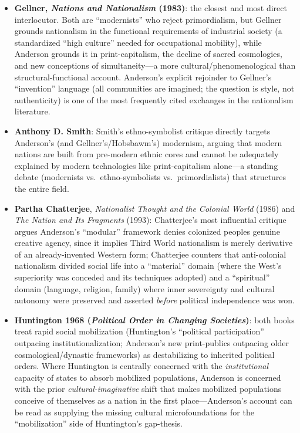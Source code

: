 \documentclass[12pt]{article}
\begin{document}
\begin{itemize}[leftmargin=*, itemsep=4pt]
    \item \textbf{Gellner, \textit{Nations and Nationalism} (1983)}: the closest and most direct interlocutor. Both are ``modernists'' who reject primordialism, but Gellner grounds nationalism in the functional requirements of industrial society (a standardized ``high culture'' needed for occupational mobility), while Anderson grounds it in print-capitalism, the decline of sacred cosmologies, and new conceptions of simultaneity---a more cultural/phenomenological than structural-functional account. Anderson's explicit rejoinder to Gellner's ``invention'' language (all communities are imagined; the question is style, not authenticity) is one of the most frequently cited exchanges in the nationalism literature.
    \item \textbf{Anthony D. Smith}: Smith's ethno-symbolist critique directly targets Anderson's (and Gellner's/Hobsbawm's) modernism, arguing that modern nations are built from pre-modern ethnic cores and cannot be adequately explained by modern technologies like print-capitalism alone---a standing debate (modernists vs.\ ethno-symbolists vs.\ primordialists) that structures the entire field.
    \item \textbf{Partha Chatterjee}, \textit{Nationalist Thought and the Colonial World} (1986) and \textit{The Nation and Its Fragments} (1993): Chatterjee's most influential critique argues Anderson's ``modular'' framework denies colonized peoples genuine creative agency, since it implies Third World nationalism is merely derivative of an already-invented Western form; Chatterjee counters that anti-colonial nationalism divided social life into a ``material'' domain (where the West's superiority was conceded and its techniques adopted) and a ``spiritual'' domain (language, religion, family) where inner sovereignty and cultural autonomy were preserved and asserted \emph{before} political independence was won.
    \item \textbf{Huntington 1968 (\textit{Political Order in Changing Societies})}: both books treat rapid social mobilization (Huntington's ``political participation'' outpacing institutionalization; Anderson's new print-publics outpacing older cosmological/dynastic frameworks) as destabilizing to inherited political orders. Where Huntington is centrally concerned with the \emph{institutional} capacity of states to absorb mobilized populations, Anderson is concerned with the prior \emph{cultural-imaginative} shift that makes mobilized populations conceive of themselves as a nation in the first place---Anderson's account can be read as supplying the missing cultural microfoundations for the ``mobilization'' side of Huntington's gap-thesis.

\end{itemize}
\end{document}
